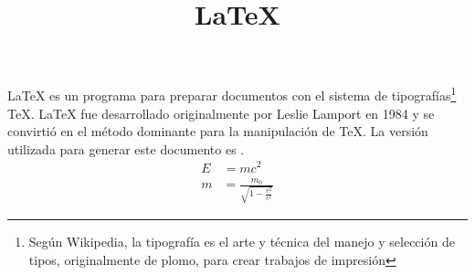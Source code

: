 \documentclass[12pt]{article}
\title{\LaTeX}
\date{}
\begin{document}
  \maketitle \LaTeX{} es un programa para preparar documentos con 
  el sistema de tipograf\'ias\footnote{%
               Seg\'un Wikipedia, la tipograf\'ia es el arte y t\'ecnica del manejo y selecci\'on de tipos, 
originalmente de plomo, para crear trabajos de impresi\'on } %
  \TeX{}. \LaTeX{} fue desarrollado originalmente por Leslie Lamport 
  en 1984 y se convirti\'o en el m\'etodo dominante para la 
  manipulaci\'on de \TeX. La versi\'on utilizada para generar 
  este documento es \LaTeXe.
  \newline
  \begin{align}
    E &= mc^2                              \\
    m &= \frac{m_0}{\sqrt{1-\frac{v^2}{c^2}}}
  \end{align}
\end{document}
